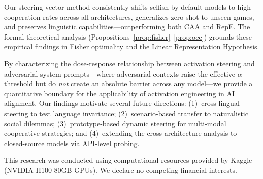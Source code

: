 \documentclass{article}
\begin{document}
Our steering vector method consistently shifts selfish-by-default models to high cooperation rates across all architectures, generalizes zero-shot to unseen games, and preserves linguistic capabilities---outperforming both CAA and RepE. The formal theoretical analysis (Propositions~\ref{prop:fisher}--\ref{prop:oce}) grounds these empirical findings in Fisher optimality and the Linear Representation Hypothesis.

By characterizing the dose-response relationship between activation steering and adversarial system prompts---where adversarial contexts raise the effective $\alpha$ threshold but do \textit{not} create an absolute barrier across any model---we provide a quantitative boundary for the applicability of activation engineering in AI alignment. Our findings motivate several future directions: (1)~cross-lingual steering to test language invariance; (2)~scenario-based transfer to naturalistic social dilemmas; (3)~prototype-based dynamic steering for multi-modal cooperative strategies; and (4)~extending the cross-architecture analysis to closed-source models via API-level probing.


\begin{ack}
This research was conducted using computational resources provided by Kaggle (NVIDIA H100 80GB GPUs). We declare no competing financial interests.
\end{ack}



\end{document}
